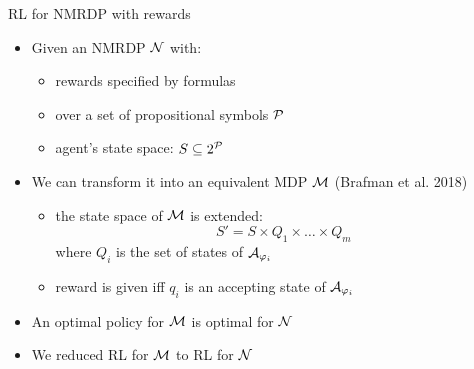 \documentclass{beamer}
\begin{document}
\begin{frame}{RL for NMRDP with \LLf rewards}
	\begin{itemize}
		\item Given an NMRDP $\mathcal{N}$ with:
		\begin{itemize}
			\item rewards specified by \LLf formulas 
			\item over a set of propositional symbols $\mathcal{P}$
			\item agent’s state space: $S \subseteq 2^{\mathcal{P}}$
		\end{itemize}
		\item 	We can transform it into an equivalent MDP $\mathcal{M}$ (Brafman et al. 2018)
		\begin{itemize}
			\item the state space of $\mathcal{M}$ is extended:\\
					\[S' = S \times Q_1 \times \dots \times Q_m\]
				where $Q_i$ is the set of states of $\mathcal{A}_{\varphi_i}$
				
			\item 	reward is given iff $q_i$ is an accepting state of $\mathcal{A}_{\varphi_i}$
		\end{itemize}

		\item An optimal policy for $\mathcal{M}$ is optimal for $\mathcal{N}$
		\item We reduced RL for $\mathcal{M}$ to RL for $\mathcal{N}$

		
	\end{itemize}
	
	
\end{frame}
\end{document}
